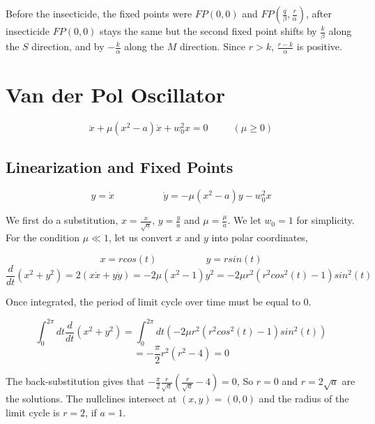 \documentclass[12pt]{article}
\begin{document}
Before the insecticide, the fixed points were $FP(0, 0)$ and $FP(\frac{q}{\beta} , \frac{r}{\alpha})$, after insecticide $FP(0,0)$ stays the same but the second fixed point shifts by $\frac{k}{\beta}$ along the $S$ direction, and by $-\frac{k}{\alpha}$ along the $M$ direction. Since $r>k$, $\frac{r-k}{\alpha}$ is positive. 



\section{Van der Pol Oscillator}

\begin{equation}
\ddot{x}+ \mu (x^2 -a) \dot{x} +w_0^2x = 0 \;\;\;\;\;\;\;\;\; (\mu \geq 0)
\end{equation}

\subsection{Linearization and Fixed Points}

\begin{equation}
y =\dot{x} \;\;\;\;\;\;\;\;\; \;\;\;\;\;\;\;\;\; \dot{y} = -\mu (x^2 -a) y -w_0^2x 
\end{equation}

We first do a substitution, $x = \frac{x}{\sqrt{a}}$, $y=\frac{y}{a}$ and $\mu = \frac{\mu}{a}$. We let $w_0 = 1$ for simplicity. For the condition $\mu \ll 1$, let us convert $x$ and $y$ into polar coordinates,

\begin{equation*}
x = r cos(t)\;\;\;\;\;\;\;\;\; \;\;\;\;\;\;\;\;\; y=rsin(t)
\end{equation*}
\begin{equation*}
\frac{d}{dt} (x^2 + y^2) = 2(x\dot{x} + y\dot{y})= -2 \mu (x^2 -1) y^2 = -2 \mu r^2 (r^2 cos^2(t) -1 ) sin^2(t) 
\end{equation*}

Once integrated, the period of limit cycle over time must be equal to 0. 

\begin{equation*}
\int_0^{2 \pi} dt \frac{d}{dt} (x^2 + y^2) = \int_0^{2 \pi} dt (-2 \mu r^2 (r^2 cos^2(t) -1 ) sin^2(t) ) 
\end{equation*}
\begin{equation*}
=- \frac{\pi}{2} r^2 (r^2-4) =0
\end{equation*}

The back-substitution gives that $- \frac{\pi}{2} \frac{r}{\sqrt{a}} (\frac{r}{\sqrt{a}}-4) =0$, So $r=0$ and $r = 2\sqrt{a}$ are the solutions. The nullclines intersect at $(x,y)=(0,0)$ and the radius of the limit cycle is $r=2$, if $a =1$.
\end{document}
